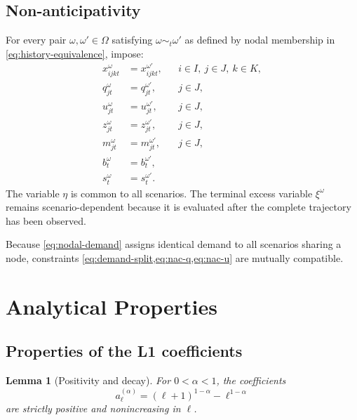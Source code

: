 \documentclass[11pt,a4paper]{article}
\newtheorem{lemma}{Lemma}
\begin{document}
\subsection{Non-anticipativity}

For every pair \(\omega,\omega'\in\Omega\) satisfying
\(\omega\sim_t\omega'\) as defined by nodal membership in
\cref{eq:history-equivalence}, impose:
\begin{subequations}
\label{eq:nonanticipativity}
\begin{align}
  x_{ijkt}^{\omega} &= x_{ijkt}^{\omega'},
  &&i\in I,\ j\in J,\ k\in K,
  \label{eq:nac-x}\\
  q_{jt}^{\omega} &= q_{jt}^{\omega'},
  &&j\in J,
  \label{eq:nac-q}\\
  u_{jt}^{\omega} &= u_{jt}^{\omega'},
  &&j\in J,
  \label{eq:nac-u}\\
  z_{jt}^{\omega} &= z_{jt}^{\omega'},
  &&j\in J,
  \label{eq:nac-z}\\
  m_{jt}^{\omega} &= m_{jt}^{\omega'},
  &&j\in J,
  \label{eq:nac-m}\\
  b_t^\omega &= b_t^{\omega'},
  \label{eq:nac-b}\\
  s_t^\omega &= s_t^{\omega'}.
  \label{eq:nac-s}
\end{align}
\end{subequations}
The variable \(\eta\) is common to all scenarios. The terminal excess
variable \(\xi^\omega\) remains scenario-dependent because it is
evaluated after the complete trajectory has been observed.

Because \cref{eq:nodal-demand} assigns identical demand to all scenarios
sharing a node, constraints \cref{eq:demand-split,eq:nac-q,eq:nac-u} are
mutually compatible.

\section{Analytical Properties}
\label{sec:properties}

\subsection{Properties of the L1 coefficients}

\begin{lemma}[Positivity and decay]
\label{lem:l1-positivity}
For \(0<\alpha<1\), the coefficients
\[
  a_\ell^{(\alpha)}
  =
  (\ell+1)^{1-\alpha}-\ell^{1-\alpha}
\]
are strictly positive and nonincreasing in \(\ell\).
\end{lemma}
\end{document}
